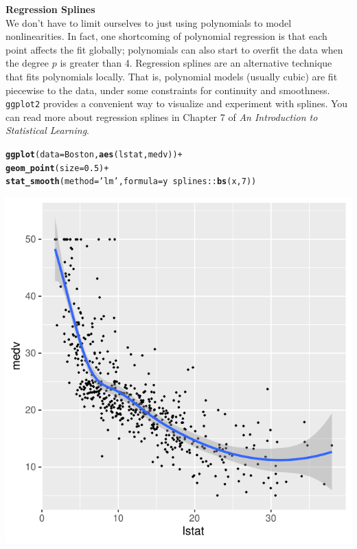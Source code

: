 \documentclass[11pt]{article}\usepackage[]{graphicx}\usepackage[]{color}
\makeatletter
\def\maxwidth{ %
  \ifdim\Gin@nat@width>\linewidth
    \linewidth
  \else
    \Gin@nat@width
  \fi
}
\newcommand{\hlnum}[1]{\textcolor[rgb]{0.686,0.059,0.569}{#1}}%
\newcommand{\hlstr}[1]{\textcolor[rgb]{0.192,0.494,0.8}{#1}}%
\newcommand{\hlopt}[1]{\textcolor[rgb]{0,0,0}{#1}}%
\newcommand{\hlstd}[1]{\textcolor[rgb]{0.345,0.345,0.345}{#1}}%
\newcommand{\hlkwc}[1]{\textcolor[rgb]{0.333,0.667,0.333}{#1}}%
\newcommand{\hlkwd}[1]{\textcolor[rgb]{0.737,0.353,0.396}{\textbf{#1}}}%
\newenvironment{kframe}{%
 \def\at@end@of@kframe{}%
 \ifinner\ifhmode%
  \def\at@end@of@kframe{\end{minipage}}%
  \begin{minipage}{\columnwidth}%
 \fi\fi%
 \def\FrameCommand##1{\hskip\@totalleftmargin \hskip-\fboxsep
 \colorbox{shadecolor}{##1}\hskip-\fboxsep
     \hskip-\linewidth \hskip-\@totalleftmargin \hskip\columnwidth}%
 \MakeFramed {\advance\hsize-\width
   \@totalleftmargin\z@ \linewidth\hsize
   \@setminipage}}%
 {\par\unskip\endMakeFramed%
 \at@end@of@kframe}
\newenvironment{knitrout}{}{} %
\makeatother
\begin{document}
\large \textbf{Regression Splines}\\

\normalsize
We don't have to limit ourselves to just using polynomials to model nonlinearities.  In fact, one shortcoming of polynomial regression is that each point affects the fit globally; polynomials can also start to overfit the data when the degree $p$ is greater than 4. Regression splines are an alternative technique that fits polynomials locally.  That is, polynomial models (usually cubic) are fit piecewise to the data, under some constraints for continuity and smoothness.  \texttt{ggplot2} provides a convenient way to visualize and experiment with splines.  You can read more about regression splines in Chapter 7 of \emph{An Introduction to Statistical Learning}.  

\begin{knitrout}
\color{fgcolor}\begin{kframe}
\begin{alltt}
\hlkwd{ggplot}\hlstd{(}\hlkwc{data}\hlstd{=Boston,} \hlkwd{aes}\hlstd{(lstat, medv))} \hlopt{+}
  \hlkwd{geom_point}\hlstd{(}\hlkwc{size}\hlstd{=}\hlnum{0.5}\hlstd{)} \hlopt{+}
  \hlkwd{stat_smooth}\hlstd{(}\hlkwc{method} \hlstd{=} \hlstr{'lm'}\hlstd{,} \hlkwc{formula} \hlstd{= y} \hlopt{~} \hlstd{splines}\hlopt{::}\hlkwd{bs}\hlstd{(x,}\hlnum{7}\hlstd{))}
\end{alltt}
\end{kframe}
\includegraphics[width=\maxwidth]{figure/unnamed-chunk-10-1} 

\end{knitrout}
\end{document}
